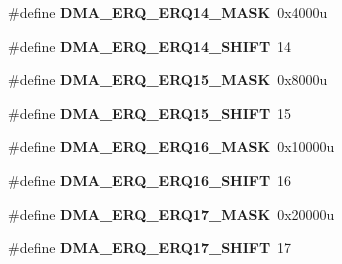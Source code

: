 \begin{DoxyCompactItemize}
\item 
\hypertarget{group___d_m_a___register___masks_ga41e772c4e32bb0c2546bd32b9207aece}{}\#define {\bfseries D\+M\+A\+\_\+\+E\+R\+Q\+\_\+\+E\+R\+Q14\+\_\+\+M\+A\+S\+K}~0x4000u\label{group___d_m_a___register___masks_ga41e772c4e32bb0c2546bd32b9207aece}

\item 
\hypertarget{group___d_m_a___register___masks_gaa8b288df3c11c83516e460ec8f1c06b6}{}\#define {\bfseries D\+M\+A\+\_\+\+E\+R\+Q\+\_\+\+E\+R\+Q14\+\_\+\+S\+H\+I\+F\+T}~14\label{group___d_m_a___register___masks_gaa8b288df3c11c83516e460ec8f1c06b6}

\item 
\hypertarget{group___d_m_a___register___masks_ga6152f3575742083b05d6df10bd9d09e5}{}\#define {\bfseries D\+M\+A\+\_\+\+E\+R\+Q\+\_\+\+E\+R\+Q15\+\_\+\+M\+A\+S\+K}~0x8000u\label{group___d_m_a___register___masks_ga6152f3575742083b05d6df10bd9d09e5}

\item 
\hypertarget{group___d_m_a___register___masks_ga49ce30d8d6925a45dfc85fdf08b71bfd}{}\#define {\bfseries D\+M\+A\+\_\+\+E\+R\+Q\+\_\+\+E\+R\+Q15\+\_\+\+S\+H\+I\+F\+T}~15\label{group___d_m_a___register___masks_ga49ce30d8d6925a45dfc85fdf08b71bfd}

\item 
\hypertarget{group___d_m_a___register___masks_gab93247553793eeb56bdd955ffd8a3c73}{}\#define {\bfseries D\+M\+A\+\_\+\+E\+R\+Q\+\_\+\+E\+R\+Q16\+\_\+\+M\+A\+S\+K}~0x10000u\label{group___d_m_a___register___masks_gab93247553793eeb56bdd955ffd8a3c73}

\item 
\hypertarget{group___d_m_a___register___masks_ga2a81d0c32b30f42ae9e8da4fdca2fd18}{}\#define {\bfseries D\+M\+A\+\_\+\+E\+R\+Q\+\_\+\+E\+R\+Q16\+\_\+\+S\+H\+I\+F\+T}~16\label{group___d_m_a___register___masks_ga2a81d0c32b30f42ae9e8da4fdca2fd18}

\item 
\hypertarget{group___d_m_a___register___masks_ga7f58b809bdb50f83f66c1e814932eabd}{}\#define {\bfseries D\+M\+A\+\_\+\+E\+R\+Q\+\_\+\+E\+R\+Q17\+\_\+\+M\+A\+S\+K}~0x20000u\label{group___d_m_a___register___masks_ga7f58b809bdb50f83f66c1e814932eabd}

\item 
\hypertarget{group___d_m_a___register___masks_gae9ab98fe4de90dac5c7e48ee3538be24}{}\#define {\bfseries D\+M\+A\+\_\+\+E\+R\+Q\+\_\+\+E\+R\+Q17\+\_\+\+S\+H\+I\+F\+T}~17\label{group___d_m_a___register___masks_gae9ab98fe4de90dac5c7e48ee3538be24}


\end{DoxyCompactItemize}
